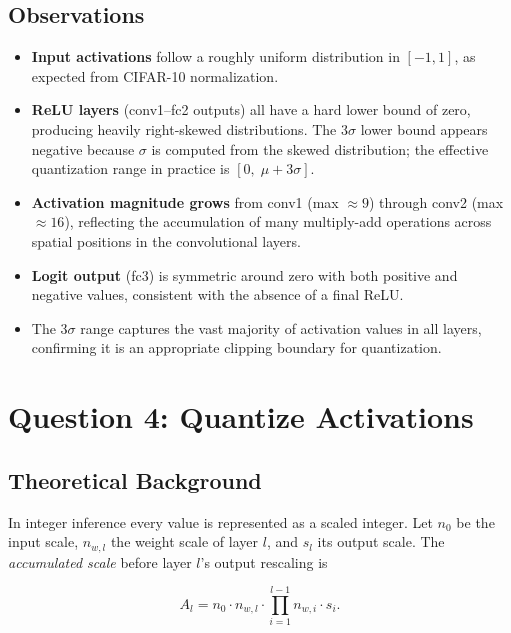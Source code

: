 \documentclass[11pt, letterpaper]{article}
\begin{document}
\subsection{Observations}
\begin{itemize}
  \item \textbf{Input activations} follow a roughly uniform distribution in $[-1,1]$,
        as expected from CIFAR-10 normalization.
  \item \textbf{ReLU layers} (conv1--fc2 outputs) all have a hard lower bound of zero,
        producing heavily right-skewed distributions. The $3\sigma$ lower bound appears
        negative because $\sigma$ is computed from the skewed distribution; the effective
        quantization range in practice is $[0,\;\mu+3\sigma]$.
  \item \textbf{Activation magnitude grows} from conv1 (max $\approx9$) through conv2
        (max $\approx16$), reflecting the accumulation of many multiply-add operations
        across spatial positions in the convolutional layers.
  \item \textbf{Logit output} (fc3) is symmetric around zero with both positive and
        negative values, consistent with the absence of a final ReLU.
  \item The $3\sigma$ range captures the vast majority of activation values in all layers,
        confirming it is an appropriate clipping boundary for quantization.
\end{itemize}

\section{Question 4: Quantize Activations}

\subsection{Theoretical Background}

In integer inference every value is represented as a scaled integer.
Let $n_0$ be the input scale, $n_{w,l}$ the weight scale of layer $l$,
and $s_l$ its output scale. The \emph{accumulated scale} before layer $l$'s
output rescaling is

\begin{equation}
  A_l = n_0 \cdot n_{w,l} \cdot \prod_{i=1}^{l-1} n_{w,i}\cdot s_i.
  \label{eq:acc_scale}
\end{equation}
\end{document}
